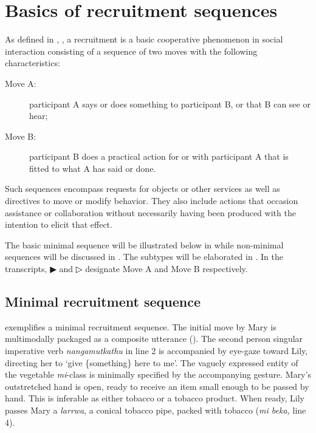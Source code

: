 \documentclass[output=paper,nonflat,colorlinks,citecolor=brown]{langsci/langscibook}
\begin{document}
\section{Basics of recruitment sequences}\label{sec:blythe:2}

As defined in , , a recruitment is a basic cooperative phenomenon in social interaction consisting of a sequence of two moves with the following characteristics:

\begin{description}
\item[Move A:] participant A says or does something to participant B, or that B can see or hear;
\item[Move B:] participant B does a practical action for or with participant A that is fitted to what A has said or done.
\end{description}

Such sequences encompass requests for objects or other services as well as directives to move or modify behavior. They also include actions that occasion assistance or collaboration without necessarily having been produced with the intention to elicit that effect.


The basic minimal sequence will be illustrated below in  while non-minimal sequences will be discussed in . The subtypes will be elaborated in . In the transcripts, ▶ and ▷ designate Move A and Move B respectively.

\subsection{Minimal recruitment sequence}\label{sec:blythe:2.1}

 exemplifies a minimal recruitment sequence. The initial move by Mary is multimodally packaged as a composite utterance (\citealt{Kendon2004,Enfield2009}). The second person singular imperative verb \textit{nangamutkathu} in line 2 is accompanied by eye-gaze toward Lily, directing her to ‘give \{something\} here to me’. The vaguely expressed entity of the vegetable \textit{mi}{}-class is minimally specified by the accompanying gesture. Mary’s outstretched hand is open, ready to receive an item small enough to be passed by hand. This is inferable as either tobacco or a tobacco product. When ready, Lily passes Mary a \textit{larrwa}, a conical tobacco pipe, packed with tobacco (\textit{mi beka,} line 4).
\end{document}
